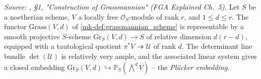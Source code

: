 \begin{theorem}\label{mk-thm:grassmannian_representable}
  \leanok

  \textit{Source: \cite{nitsure-hilbert-quot}, \S 1, "Construction of Grassmannian" (FGA
  Explained Ch.~5).}
  Let \(S\) be a noetherian scheme, \(V\) a locally free \(\mathcal{O}_S\)-module
  of rank \(r\), and \(1 \le d \le r\). The functor \(\mathrm{Grass}(V,d)\) of
  \ref{mk-def:grassmannian_scheme} is representable by a smooth projective
  \(S\)-scheme \(\mathrm{Gr}_S(V, d) \to S\) of relative dimension \(d(r-d)\),
  equipped with a tautological quotient
  \(\pi^* V \twoheadrightarrow \mathcal{U}\) of rank \(d\). The determinant
  line bundle \(\det(\mathcal{U})\) is relatively very ample, and the
  associated linear system gives a closed embedding
  \(\mathrm{Gr}_S(V, d) \hookrightarrow
  \mathbb{P}_S\!\left(\bigwedge^d V\right)\) -- the \emph{Pl\"ucker embedding}.

\end{theorem}
